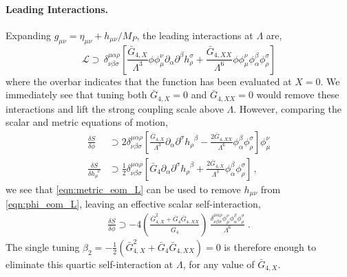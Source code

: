 \documentclass[11pt]{article}
\newcommand{\G}{  \bar{G} }
\begin{document}
\paragraph{Leading Interactions.}
Expanding $g_{\mu\nu} = \eta_{\mu\nu} + h_{\mu\nu}/M_P$, the leading interactions at $\Lambda$ are,
\begin{equation}
\mathcal{L}  \supset \, \delta^{\mu \alpha \rho}_{\nu \beta \sigma} \left[  \frac{ \G_{4,X}}{\Lambda^3}  \phi  \phi_\mu^\nu  \partial_\alpha \partial^\beta h_{\rho}^{\sigma}  + \frac{ \G_{4,XX}}{\Lambda^6} \phi  \phi_\mu^\nu \phi_\alpha^\beta  \phi_\rho^\sigma   \right]  
\label{eqn:Horndeski_vertex_LO}
\end{equation}
where the overbar indicates that the function has been evaluated at $X=0$. 
We immediately see that tuning both $\bar{G}_{4,X} = 0$ and $\bar{G}_{4,XX} = 0$ would remove these interactions and lift the strong  coupling scale above $\Lambda$.  
However, comparing the scalar and metric equations of motion, \\[-12pt]
\begin{align}
\frac{\delta S}{\delta \phi} &\supset
 2 \delta^{\mu \alpha \rho}_{\nu \beta \sigma} \left[  \frac{ \bar{G}_{4,X} }{ \Lambda^3 } \partial_{\alpha} \partial^{\sigma} h_{\rho}^{\;\; \beta} -  \frac{2 \bar{G}_{4,XX} }{\Lambda^6}   \phi_\alpha^\beta \phi_\rho^\sigma   \right] \phi_\mu^\nu  
 \label{eqn:phi_eom_L} \\ 
%
\frac{\delta S}{\delta h^{\;\;\nu}_{\mu}} &\supset
\frac{1}{2} \delta_{\nu \beta \sigma}^{\mu \alpha \rho} \left[  \bar{G}_4  \partial_\alpha \partial^\sigma h_{\rho }^{\;\; \beta} + \frac{2 \bar{G}_{4,X}}{ \Lambda^3} \phi_\alpha^\beta \phi_\rho^\sigma  \right]     \, ,
\label{eqn:metric_eom_L}
\end{align}
we see that \eqref{eqn:metric_eom_L} can be used to remove $h_{\mu\nu}$ from \eqref{eqn:phi_eom_L}, leaving an effective scalar self-interaction,
\begin{align}
\frac{\delta S}{\delta \phi}  \supset  - 4 \left(  \frac{ \bar{G}_{4,X}^2 + \bar{G}_4 \bar{G}_{4,XX} }{ \bar{G}_4} \right) \, \frac{ \delta^{\mu \alpha \rho}_{\nu \beta \sigma} \phi_\mu^\nu \phi_\alpha^\beta  \phi_\rho^\sigma }{  \Lambda^6 }   \; . 
\label{eqn:phi_eom_L2}
\end{align}
The single tuning $\beta_2 = - \tfrac{1}{2} \left(  \bar{G}_{4,X}^2 + \bar{G}_4 \bar{G}_{4,XX} \right) = 0$ is therefore enough to eliminate this quartic self-interaction at $\Lambda$, for any value of $\bar{G}_{4,X}$. 
\end{document}
